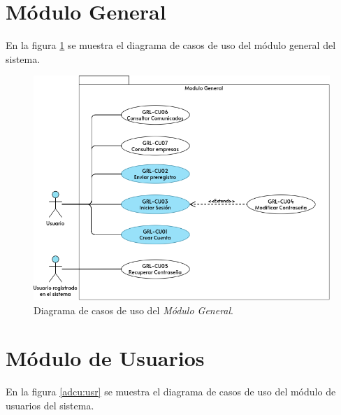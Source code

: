 \section{Módulo General}
	En la figura \ref{adcu:grl} se muestra el diagrama de casos de uso del módulo general del sistema.

	\begin{figure}[hbtp!]
		\begin{center}
			\includegraphics[width=.8\textwidth]{sprints/imagenes/CUGRL.png}
		\end{center}
		
		\caption{Diagrama de casos de uso del \textit{Módulo General}.}
		\label{adcu:grl}
	\end{figure}

	
	

	
	

	
	

	
	

	
	
	
	
	

	
	

	
	

	
	

\section{Módulo de Usuarios}
	En la figura \ref{adcu:usr} se muestra el diagrama de casos de uso del módulo de usuarios del sistema.

